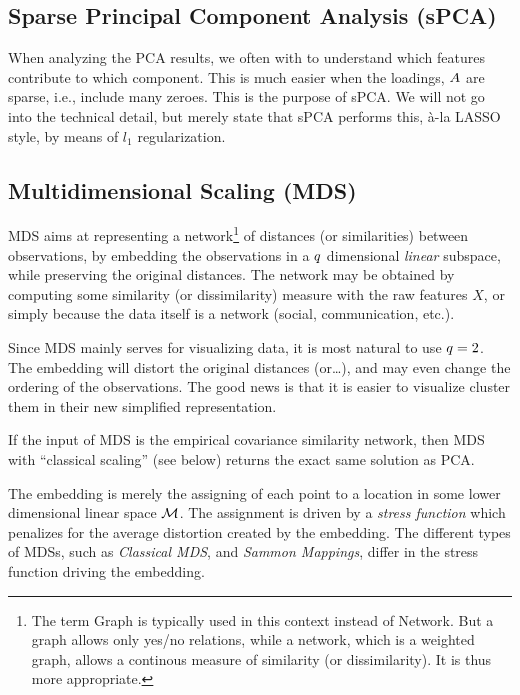 \subsection{Sparse Principal Component Analysis (sPCA)}
\label{sec:spca}

When analyzing the PCA results, we often with to understand which features contribute to which component. 
This is much easier when the loadings, $A$ are sparse, i.e., include many zeroes. 
This is the purpose of sPCA. 
We will not go into the technical detail, but merely state that sPCA performs this, \`a-la LASSO style, by means of $l_1$ regularization.






\subsection{Multidimensional Scaling (MDS)}
\label{sec:mds}

MDS aims at representing a network\footnote{The term Graph is typically used in this context instead of Network. But a graph allows only yes/no relations, while a network, which is a weighted graph, allows a continous measure of similarity (or dissimilarity). It is thus more appropriate.} of distances (or similarities) between observations, by embedding the observations in a $q$ dimensional \emph{linear} subspace, while preserving the original distances.
The network may be obtained by computing some similarity (or dissimilarity) measure with the raw features $X$, or simply because the data itself is a network (social, communication, etc.).

Since MDS mainly serves for visualizing data, it is most natural to use $q=2$. 
The embedding will distort the original distances (or\dots), and may even change the ordering of the observations. The good news is that it is easier to visualize \andor cluster them in their new simplified representation. 

If the input of MDS is the empirical covariance similarity network, then MDS with ``classical scaling'' (see below) returns the exact same solution as PCA.

The embedding is merely the assigning of each point to a location in some lower dimensional linear space $\mathcal{M}$. 
The assignment is driven by a \emph{stress function} which penalizes for the average distortion created by the embedding.
The different types of MDSs, such as \emph{Classical MDS}, and \emph{Sammon Mappings}, differ in the stress function driving the embedding.

